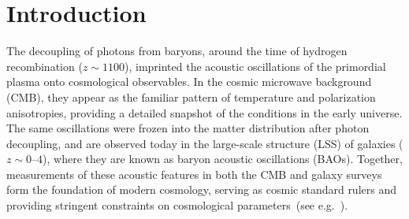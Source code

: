 \documentclass[floats,floatfix,showpacs,amssymb,prd,twocolumn,superscriptaddress,nofootinbib,reprint,preprintnumbers]{revtex4-2}
\begin{document}
\date{\today}
\maketitle

\section{Introduction}

\noindent The decoupling of photons from baryons, around the time of hydrogen recombination ($z\sim 1100$), imprinted the acoustic oscillations of the primordial plasma onto cosmological observables. In the cosmic microwave background (CMB), they appear as the familiar pattern of temperature and polarization anisotropies, providing a detailed snapshot of the conditions in the early universe. The same oscillations were frozen into the matter distribution after photon decoupling, and are observed today in the large-scale  structure (LSS) of galaxies ($z\sim0$–$4$), where they are known as baryon acoustic oscillations (BAOs). Together, measurements of these acoustic features in both
the CMB and galaxy surveys form the foundation of modern cosmology, serving as cosmic standard rulers and providing stringent constraints on cosmological parameters~(see e.g.~\cite{Annis:2022xgg, Chang:2022lrw}). 
\end{document}
